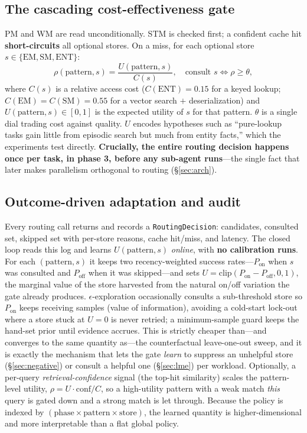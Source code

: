\documentclass[10pt,twocolumn]{article}
\newcommand{\code}[1]{\texttt{\small #1}}
\begin{document}
\subsection{The cascading cost-effectiveness gate}\label{sec:gate}
PM and WM are read unconditionally. STM is checked first; a confident cache hit
\textbf{short-circuits} all optional stores. On a miss, for each optional store
$s \in \{\text{EM},\text{SM},\text{ENT}\}$:
\[
\rho(\text{pattern},s) = \frac{U(\text{pattern},s)}{C(s)},\quad
\text{consult } s \iff \rho \geq \theta,
\]
where $C(s)$ is a relative access cost ($C(\text{ENT}){=}0.15$ for a keyed
lookup; $C(\text{EM}){=}C(\text{SM}){=}0.55$ for a vector search $+$
deserialization) and $U(\text{pattern},s)\in[0,1]$ is the expected utility of $s$
for that pattern. $\theta$ is a single dial trading cost against quality. $U$
encodes hypotheses such as ``pure-lookup tasks gain little from episodic search
but much from entity facts,'' which the experiments test directly.
\textbf{Crucially, the entire routing decision happens once per task, in phase 3,
before any sub-agent runs}---the single fact that later makes parallelism
orthogonal to routing (\S\ref{sec:arch}).

\subsection{Outcome-driven adaptation and audit}\label{sec:loop}
Every routing call returns and records a \code{RoutingDecision}: candidates,
consulted set, skipped set with per-store reasons, cache hit/miss, and latency. The
closed loop reads this log and learns $U(\text{pattern},s)$ \emph{online}, with
\textbf{no calibration runs}. For each $(\text{pattern},s)$ it keeps two
recency-weighted success rates---$P_{\mathrm{on}}$ when $s$ was consulted and
$P_{\mathrm{off}}$ when it was skipped---and sets $U=\mathrm{clip}(P_{\mathrm{on}}-
P_{\mathrm{off}},0,1)$, the marginal value of the store harvested from the natural
on/off variation the gate already produces. $\epsilon$-exploration occasionally
consults a sub-threshold store so $P_{\mathrm{on}}$ keeps receiving samples (value
of information), avoiding a cold-start lock-out where a store stuck at $U{=}0$ is
never retried; a minimum-sample guard keeps the hand-set prior until evidence
accrues. This is strictly cheaper than---and converges to the same quantity as---the
counterfactual leave-one-out sweep, and it is exactly the mechanism that lets the
gate \emph{learn} to suppress an unhelpful store (\S\ref{sec:negative}) or consult a
helpful one (\S\ref{sec:lme}) per workload. Optionally, a per-query
\emph{retrieval-confidence} signal (the top-hit similarity) scales the
pattern-level utility, $\rho=U\cdot\mathrm{conf}/C$, so a high-utility pattern with a
weak match \emph{this} query is gated down and a strong match is let through. Because
the policy is indexed by $(\text{phase}\times\text{pattern}\times\text{store})$, the
learned quantity is higher-dimensional and more interpretable than a flat global
policy.
\end{document}
